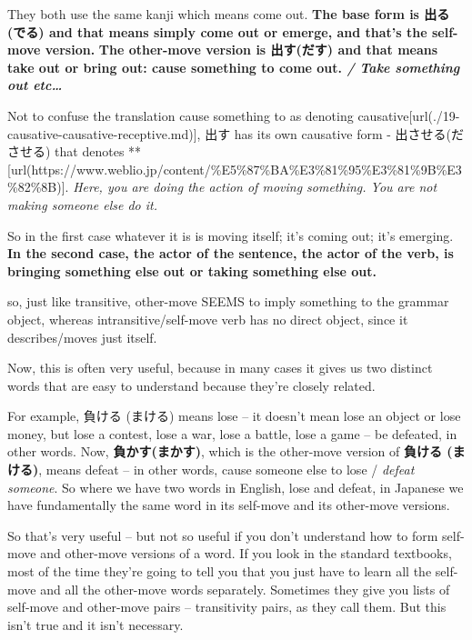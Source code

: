 {}

They both use the same kanji which means come out. {\bf The base form is 出る(でる) and that means simply come out or emerge, and that's the self-move version.} {\bf The other-move version is 出す(だす) and that means take out or bring out: cause something to come out. {\em / Take something out etc\ldots{}}}

Not to confuse the translation cause something to as denoting causative\goto{{[}19{]}}[url(./19-causative-causative-receptive.md)],\crlf
出す has its own causative form - 出させる(ださせる) that denotes **[url(https://www.weblio.jp/content/\%E5\%87\%BA\%E3\%81\%95\%E3\%81\%9B\%E3\%82\%8B)].\crlf
{\em Here, you are doing the action of moving something. You are not making someone else do it.}

So in the first case whatever it is is moving itself; it's coming out; it's emerging. {\bf In the second case, the actor of the sentence, the actor of the verb, is bringing something else out or taking something else out.}

so, just like transitive, other-move SEEMS to imply something to the grammar object, whereas intransitive/self-move verb has no direct object, since it describes/moves just itself.

Now, this is often very useful, because in many cases it gives us two distinct words that are easy to understand because they're closely related.

\thinrule

For example, 負ける (まける) means lose -- it doesn't mean lose an object or lose money, but lose a contest, lose a war, lose a battle, lose a game -- be defeated, in other words. Now, {\bf 負かす(まかす)}, which is the other-move version of {\bf 負ける (まける)}, means defeat -- in other words, cause someone else to lose / {\em defeat someone}. So where we have two words in English, lose and defeat, in Japanese we have fundamentally the same word in its self-move and its other-move versions.

\thinrule

So that's very useful -- but not so useful if you don't understand how to form self-move and other-move versions of a word. If you look in the standard textbooks, most of the time they're going to tell you that you just have to learn all the self-move and all the other-move words separately. Sometimes they give you lists of self-move and other-move pairs -- transitivity pairs, as they call them. But this isn't true and it isn't necessary.

